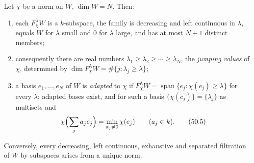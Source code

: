 \begin{lemma}
\label{lem:ch50-norm-is-filtration}
Let $\chi$ be a norm on $W$, $\dim W=N$.  Then:
\begin{enumerate}
\item\label{itm:ch50-nf:subspace}
      each $F^\lambda_\chi W$ is a $k$-subspace, the family is
      decreasing and left continuous in $\lambda$, equals $W$ for
      $\lambda$ small and $0$ for $\lambda$ large, and has at most
      $N+1$ distinct members;
\item\label{itm:ch50-nf:jumps}
      consequently there are real numbers
      $\lambda_1\ge\lambda_2\ge\cdots\ge\lambda_N$, the \emph{jumping
      values} of $\chi$, determined by
      $\dim F^\lambda_\chi W=\#\{j:\lambda_j\ge\lambda\}$;
\item\label{itm:ch50-nf:adapted}
      a basis $e_1,\dots,e_N$ of $W$ is \emph{adapted} to $\chi$ if
      $F^\lambda_\chi W=\operatorname{span}\{e_j:\chi(e_j)\ge\lambda\}$
      for every $\lambda$; adapted bases exist, and for such a basis
      $\{\chi(e_j)\}=\{\lambda_j\}$ as multisets and
      \[
       \chi\Bigl(\sum_ja_je_j\Bigr)=\min_{a_j\ne0}\chi(e_j)
       \qquad(a_j\in k).
      \tag{50.5}\label{eq:ch50-orthogonal}
      \]
\end{enumerate}
Conversely, every decreasing, left continuous, exhaustive and separated
filtration of $W$ by subspaces arises from a unique norm.
\end{lemma}


